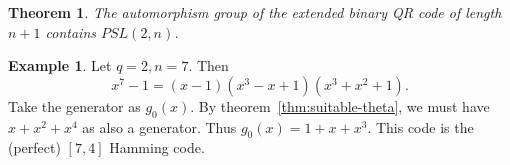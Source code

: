 \documentclass{article}
\renewcommand{\=}{\equiv}
\theoremstyle{plain}
\newtheorem{thm}{Theorem}[subsection]
\newtheorem*{cor}{Corollary}
\theoremstyle{definition}
\newtheorem{exmp}{Example}[subsection]
\begin{document}
\begin{thm}
\label{thm:qr-auto}
The automorphism group of the extended binary QR code of length $n+1$ contains $PSL(2,n)$.
\end{thm}



\begin{exmp}
Let $q = 2, n = 7$.
Then
$$ x^7 - 1 = (x-1) (x^3 - x + 1) (x^3 + x^2 + 1). $$
Take the generator as $g_0(x)$.
By theorem~\ref{thm:suitable-theta}, we must have $x + x^2 + x^4$ as also a generator.
Thus $g_0(x) = 1 + x + x^3$.
This code is the (perfect) $[7,4]$ Hamming code. %
\end{exmp}
\end{document}
